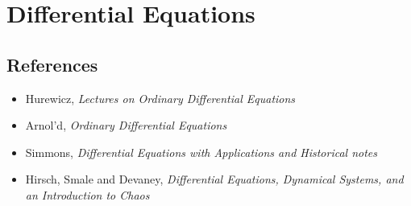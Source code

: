 \section{Differential Equations}
\subsection*{References}
\begin{itemize}
    \item Hurewicz, \emph{Lectures on Ordinary Differential Equations}
    \item Arnol'd, \emph{Ordinary Differential Equations}
    \item Simmons, \emph{Differential Equations with Applications and Historical
        notes}
    \item Hirsch, Smale and Devaney, \emph{Differential Equations, Dynamical
        Systems, and an Introduction to Chaos}
\end{itemize}
